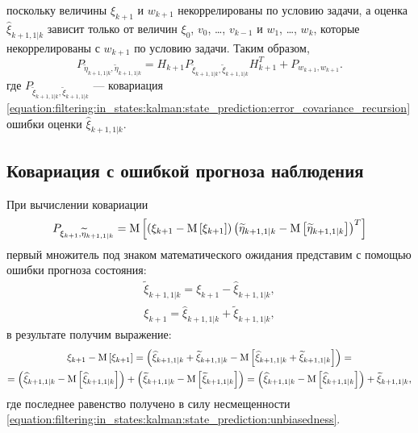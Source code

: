 поскольку величины $\xi_{k+1}$ и $w_{k+1}$ некоррелированы по условию задачи, а оценка $\widehat{\xi}_{k+1,1|k}$ зависит только от величин $\xi_0$, $v_0$, \dots, $v_{k-1}$
и $w_1$, \dots, $w_{k}$, которые некоррелированы с $w_{k+1}$ по условию задачи. Таким образом,
\begin{equation} \label{equation:filtering:in_states:kalman:observation_prediction:error_covariance_recursion}
	P_{\widetilde{\eta}_{k+1, 1|k}, \widetilde{\eta}_{k+1, 1|k}} = H_{k+1} P_{\widetilde{\xi}_{k+1,1|k}, \widetilde{\xi}_{k+1,1|k}} H_{k+1}^T + P_{w_{k+1}, w_{k+1}}
	.
\end{equation}
где $P_{\widetilde{\xi}_{k+1,1|k}, \widetilde{\xi}_{k+1,1|k}}$ --- ковариация \eqref{equation:filtering:in_states:kalman:state_prediction:error_covariance_recursion}
ошибки оценки $\widehat{\xi}_{k+1,1|k}$.

\subsection{Ковариация с ошибкой прогноза наблюдения}

При вычислении ковариации
$$
	P_{\xi_{k+1}, \widetilde{\eta}_{k+1, 1|k}}
		= \mathrm{M} \left [ \left ( \xi_{k+1} - \mathrm{M} \left [ \xi_{k+1} \right ] \right ) \left ( \widetilde{\eta}_{k+1, 1|k} - \mathrm{M} \left [ \widetilde{\eta}_{k+1, 1|k} \right ] \right )^T \right ]
$$
первый множитель под знаком математического ожидания представим с помощью ошибки прогноза состояния:
\begin{gather*}
	\widetilde{\xi}_{k+1,1|k} = \xi_{k+1} - \widehat{\xi}_{k+1,1|k} , \\
	\xi_{k+1} = \widehat{\xi}_{k+1,1|k} + \widetilde{\xi}_{k+1,1|k} ,
\end{gather*}
в результате получим выражение:
\begin{multline*}
	\xi_{k+1} - \mathrm{M} \left [ \xi_{k+1} \right ]
	= \left ( \widehat{\xi}_{k+1,1|k} + \widetilde{\xi}_{k+1,1|k} - \mathrm{M} \left [ \widehat{\xi}_{k+1,1|k} + \widetilde{\xi}_{k+1,1|k} \right ] \right ) = \\
	= \left ( \widehat{\xi}_{k+1,1|k} - \mathrm{M} \left [ \widehat{\xi}_{k+1,1|k} \right ] \right ) + \left ( \widetilde{\xi}_{k+1,1|k} - \mathrm{M} \left [ \widetilde{\xi}_{k+1,1|k} \right ] \right )
	= \left ( \widehat{\xi}_{k+1,1|k} - \mathrm{M} \left [ \widehat{\xi}_{k+1,1|k} \right ] \right ) + \widetilde{\xi}_{k+1,1|k} ,
\end{multline*}
где последнее равенство получено в силу несмещенности \eqref{equation:filtering:in_states:kalman:state_prediction:unbiasedness}.

